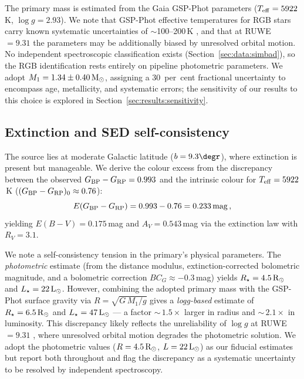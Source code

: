 \documentclass[usenatbib,fleqn]{mnras}
\newcommand{\Msun}{{\rm M}_\odot}
\newcommand{\Lsun}{{\rm L}_\odot}
\newcommand{\Rsun}{{\rm R}_\odot}
\begin{document}
The primary mass is estimated from the Gaia GSP-Phot parameters
($T_{\rm eff} = 5922$\,K, $\log g = 2.93$).  We note that
GSP-Phot effective temperatures for RGB stars carry known
systematic uncertainties of $\sim$100--200\,K
\citep{Andrae2023}, and that at RUWE~$= 9.31$ the parameters
may be additionally biased by unresolved orbital motion.
No independent spectroscopic classification exists
(Section~\ref{sec:data:simbad}), so the RGB identification
rests entirely on pipeline photometric parameters.  We adopt
$M_1 = 1.34 \pm 0.40\,\Msun$, assigning a 30~per~cent
fractional uncertainty to encompass age, metallicity,
and systematic errors; the sensitivity of our results to this
choice is explored in Section~\ref{sec:results:sensitivity}.

\subsection{Extinction and SED self-consistency}
\label{sec:methods:extinction}

The source lies at moderate Galactic latitude ($b = 9.3\degr$),
where extinction is present but manageable.  We derive the colour
excess from the discrepancy between the observed
$G_{\rm BP} - G_{\rm RP} = 0.993$ and the intrinsic colour for
$T_{\rm eff} = 5922$\,K
($(G_{\rm BP} - G_{\rm RP})_0 \approx 0.76$):
\begin{equation}
E(G_{\rm BP} - G_{\rm RP}) = 0.993 - 0.76 = 0.233\,{\rm mag}\,,
\end{equation}
yielding $E(B-V) = 0.175$\,mag and
$A_V = 0.543$\,mag via the \citet{Cardelli1989} extinction law
with $R_V = 3.1$.

We note a self-consistency tension in the primary's physical
parameters.  The \emph{photometric} estimate (from the
distance modulus, extinction-corrected bolometric magnitude, and
a bolometric correction $BC_G \approx -0.3$\,mag) yields
$R_\star = 4.5\,\Rsun$ and $L_\star = 22\,\Lsun$.  However,
combining the adopted primary mass with the GSP-Phot surface gravity
via $R = \sqrt{G\,M_1 / g}$ gives a \emph{logg-based}
estimate of $R_\star = 6.5\,\Rsun$ and
$L_\star = 47\,\Lsun$ --- a factor $\sim$\,$1.5\times$ larger in
radius and $\sim$\,$2.1\times$ in luminosity.  This discrepancy
likely reflects the unreliability of $\log g$ at
RUWE~$= 9.31$ \citep{Andrae2023}, where unresolved orbital motion
degrades the photometric solution.  We adopt the photometric
values ($R = 4.5\,\Rsun$, $L = 22\,\Lsun$) as our fiducial
estimates but report both throughout and flag the discrepancy
as a systematic uncertainty to be resolved by independent
spectroscopy.
\end{document}
